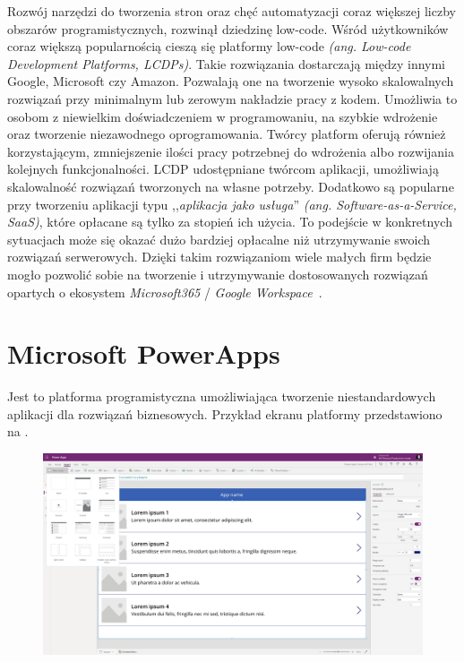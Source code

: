 Rozwój narzędzi do tworzenia stron oraz chęć automatyzacji coraz większej liczby obszarów programistycznych, rozwinął dziedzinę low-code. Wśród użytkowników coraz większą popularnością cieszą się platformy low-code \textit{(ang. Low-code Development Platforms, LCDPs)}. Takie rozwiązania dostarczają między innymi Google, Microsoft czy Amazon. Pozwalają one na tworzenie wysoko skalowalnych rozwiązań przy minimalnym lub zerowym nakładzie pracy z kodem. Umożliwia to osobom z niewielkim doświadczeniem w programowaniu, na szybkie wdrożenie oraz tworzenie niezawodnego oprogramowania. Twórcy platform oferują również korzystającym, zmniejszenie ilości pracy potrzebnej do wdrożenia albo rozwijania kolejnych funkcjonalności. LCDP udostępniane twórcom aplikacji, umożliwiają skalowalność rozwiązań tworzonych na własne potrzeby. Dodatkowo są popularne przy tworzeniu aplikacji typu ,,\textit{aplikacja jako usługa}'' \textit{(ang. Software-as-a-Service, SaaS)}, które opłacane są tylko za stopień ich użycia. To podejście w konkretnych sytuacjach może się okazać dużo bardziej opłacalne niż utrzymywanie swoich rozwiązań serwerowych. Dzięki takim rozwiązaniom wiele małych firm będzie mogło pozwolić sobie na tworzenie i utrzymywanie dostosowanych rozwiązań opartych o ekosystem \textit{Microsoft365} / \textit{Google Workspace}~\cite{Bock2021,Hirzel2022}.


\section{Microsoft PowerApps}
Jest to platforma programistyczna umożliwiająca tworzenie niestandardowych aplikacji dla rozwiązań biznesowych. Przykład ekranu platformy przedstawiono na .

\begin{figure}[H]
    \centering
    \includegraphics[width=\textwidth]{images/ms_powerapps}
    \label{fig:pa-plat}
\end{figure}


